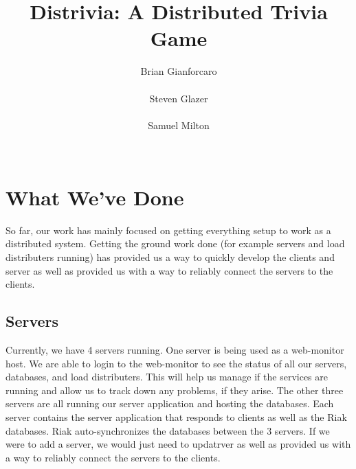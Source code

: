 \documentclass{dependencies/acm_proc_article-sp}
\begin{document}
\title{ Distrivia: A Distributed Trivia Game }
\author{
\alignauthor
Brian Gianforcaro \\
       \\
\alignauthor
Steven Glazer \\
       \\
\alignauthor
Samuel Milton \\
       \\
}
\maketitle


\section{What We've Done}
So far, our work has mainly focused on getting everything setup to work as a
distributed system. Getting the ground work done (for example servers and load
distributers running) has provided us a way to quickly develop the clients and
server as well as provided us with a way to reliably connect the servers to the
clients.

\subsection{Servers}
Currently, we have 4 servers running. One server is being used as a web-monitor
host. We are able to login to the web-monitor to see the status of all our
servers, databases, and load distributers. This will help us manage if the
services are running and allow us to track down any problems, if they arise.
The other three servers are all running our server application and hosting the
databases. Each server contains the server application that responds to clients
as well as the Riak databases. Riak auto-synchronizes the databases between the
3 servers. If we were to add a server, we would just need to updatrver as well
as provided us with a way to reliably connect the servers to the clients.
\end{document}
